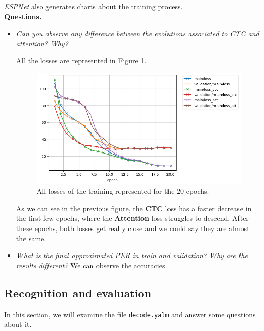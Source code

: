 \documentclass[a4paper]{article}
\def\inline{\lstinline[basicstyle=\ttfamily,keywordstyle={}]}
\begin{document}
\emph{ESPNet} also generates charts about the training process.\\

\textbf{Questions.}
\begin{itemize}
  \item \emph{Can you observe any difference between the evolutions associated to CTC and attention? Why?}

        All the losses are represented in Figure \ref{fig:all:losses}.
        \begin{figure}[H]
          \centering
          \includegraphics[scale=0.6]{Figures/loss.png}
          \caption{All losses of the training represented for the \(20\) epochs.}
          \label{fig:all:losses}
        \end{figure}
        As we can see in the previous figure, the \textbf{CTC} loss has a faster decrease in the first few epochs, where the \textbf{Attention} loss struggles to descend. After these epochs, both losses get really close and we could say they are almost the same.
  \item \emph{What is the final approximated PER in train and validation? Why are the results different? }
        We can observe the accuracies
\end{itemize}

\subsection{Recognition and evaluation}

In this section, we will examine the file \inline{decode.yalm} and answer some questions about it.
\end{document}
